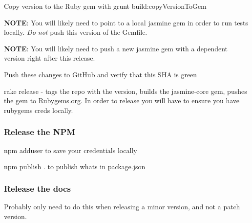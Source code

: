 \begin{DoxyEnumerate}
\item Copy version to the Ruby gem with {\ttfamily grunt build\+:copy\+Version\+To\+Gem}
\end{DoxyEnumerate}
\begin{DoxyEnumerate}
\item {\bfseries N\+O\+T\+E}\+: You will likely need to point to a local jasmine gem in order to run tests locally. {\itshape Do not} push this version of the Gemfile.
\end{DoxyEnumerate}
\begin{DoxyEnumerate}
\item {\bfseries N\+O\+T\+E}\+: You will likely need to push a new jasmine gem with a dependent version right after this release.
\end{DoxyEnumerate}
\begin{DoxyEnumerate}
\item Push these changes to Git\+Hub and verify that this S\+H\+A is green
\end{DoxyEnumerate}
\begin{DoxyEnumerate}
\item {\ttfamily rake release} -\/ tags the repo with the version, builds the {\ttfamily jasmine-\/core} gem, pushes the gem to Rubygems.\+org. In order to release you will have to ensure you have rubygems creds locally.
\end{DoxyEnumerate}

\subsubsection*{Release the N\+P\+M}


\begin{DoxyEnumerate}
\item {\ttfamily npm adduser} to save your credentials locally
\end{DoxyEnumerate}
\begin{DoxyEnumerate}
\item {\ttfamily npm publish .} to publish what\textquotesingle{}s in {\ttfamily package.\+json}
\end{DoxyEnumerate}

\subsubsection*{Release the docs}

Probably only need to do this when releasing a minor version, and not a patch version.


